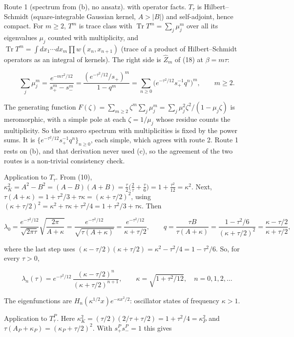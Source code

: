 \documentclass[11pt,a4paper]{article}
\newcommand{\tagmark}[1]{\marginnote{\scriptsize\ttfamily #1}}
\newcommand{\Dtag}{\tagmark{[D]}}   %
\newcommand{\Rtag}{\tagmark{[R]}}   %
\begin{document}
Route 1 (spectrum from (b), no ansatz). \Dtag{} with \Rtag{} operator
facts. \(T_\tau\) is Hilbert--Schmidt (square-integrable Gaussian
kernel, \(A>|B|\)) and self-adjoint, hence compact. \Rtag{} For
\(m\ge2\), \(T^m\) is trace class with
\(\operatorname{Tr}T^m = \sum_j\mu_j^m\) over all its eigenvalues
\(\mu_j\) counted with multiplicity, and
\(\operatorname{Tr}T^m = \int dx_1\cdots dx_m\prod w(x_n,x_{n+1})\)
(trace of a product of Hilbert--Schmidt operators as an integral of
kernels). The right side is \(\hat Z_m\) of (18) at \(\beta = m\tau\):

\[
\sum_j\mu_j^m = \frac{e^{-m\tau^2/12}}{s_+^m - s_-^m} = \frac{(e^{-\tau^2/12}/s_+)^m}{1-q^m} = \sum_{n\ge0}\big(e^{-\tau^2/12}s_+^{-1}q^n\big)^m,\qquad m\ge2.
\]

The generating function
\(F(\zeta) = \sum_{m\ge2}\zeta^m\sum_j\mu_j^m = \sum_j\mu_j^2\zeta^2/(1-\mu_j\zeta)\)
is meromorphic, with a simple pole at each \(\zeta = 1/\mu_j\) whose
residue counts the multiplicity. So the nonzero spectrum with
multiplicities is fixed by the power sums. It is
\(\{e^{-\tau^2/12}s_+^{-1}q^n\}_{n\ge0}\), each simple, which agrees
with route 2. Route 1 rests on (b), and that derivation never used (c),
so the agreement of the two routes is a non-trivial consistency check.

Application to \(T_\tau\). From (10),
\(\kappa_K^2 = A^2 - B^2 = (A-B)(A+B) = \frac\tau2\big(\frac2\tau + \frac\tau6\big) = 1 + \frac{\tau^2}{12} = \kappa^2\).
Next,
\(\tau(A+\kappa) = 1 + \tau^2/3 + \tau\kappa = (\kappa+\tau/2)^2\),
using
\((\kappa+\tau/2)^2 = \kappa^2+\tau\kappa+\tau^2/4 = 1 + \tau^2/3 + \tau\kappa\).
Then

\[
\lambda_0 = \frac{e^{-\tau^2/12}}{\sqrt{2\pi\tau}}\sqrt{\frac{2\pi}{A+\kappa}} = \frac{e^{-\tau^2/12}}{\sqrt{\tau(A+\kappa)}} = \frac{e^{-\tau^2/12}}{\kappa+\tau/2},\qquad
q = \frac{\tau B}{\tau(A+\kappa)} = \frac{1-\tau^2/6}{(\kappa+\tau/2)^2} = \frac{\kappa-\tau/2}{\kappa+\tau/2},
\]

where the last step uses
\((\kappa-\tau/2)(\kappa+\tau/2) = \kappa^2 - \tau^2/4 = 1-\tau^2/6\).
So, for every \(\tau>0\),

\[
\boxed{\,\lambda_n(\tau) = e^{-\tau^2/12}\,\frac{(\kappa - \tau/2)^n}{(\kappa+\tau/2)^{n+1}},\qquad \kappa = \sqrt{1+\tau^2/12},\quad n = 0,1,2,\dots\,} \tag{23}
\]

The eigenfunctions are \(H_n(\kappa^{1/2}x)e^{-\kappa x^2/2}\):
oscillator states of frequency \(\kappa>1\).

Application to \(T^P_\tau\). Here
\(\kappa_K^2 = (\tau/2)(2/\tau + \tau/2) = 1+\tau^2/4 = \kappa_P^2\) and
\(\tau(A_P+\kappa_P) = (\kappa_P+\tau/2)^2\). With \(s^P_+s^P_- = 1\)
this gives
\end{document}
